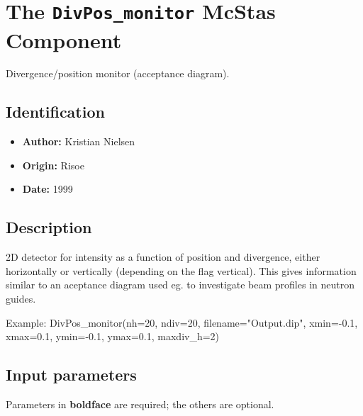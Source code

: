 \section{The \texttt{DivPos\_monitor} McStas Component}
Divergence/position monitor (acceptance diagram).

\subsection*{Identification}
\begin{itemize}
  \item \textbf{Author:} Kristian Nielsen
  \item \textbf{Origin:} Risoe
  \item \textbf{Date:} 1999
\end{itemize}

\subsection*{Description}
2D detector for intensity as a function of position and divergence, either horizontally or vertically (depending on the flag vertical). This gives information similar to an aceptance diagram used eg. to investigate beam profiles in neutron guides.

Example: DivPos\_monitor(nh=20, ndiv=20, filename="Output.dip", xmin=-0.1, xmax=0.1, ymin=-0.1, ymax=0.1, maxdiv\_h=2)

\subsection*{Input parameters}
Parameters in \textbf{boldface} are required; the others are optional.

